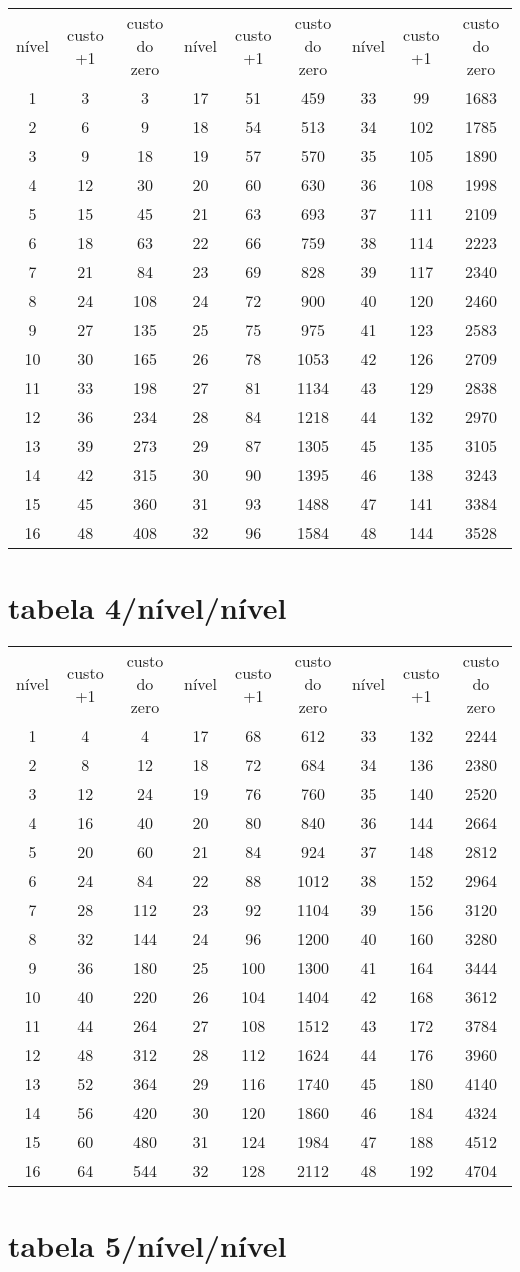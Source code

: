 \begin{longtable}{|c|c|c|c|c|c|c|c|c|}
    nível&custo +1&custo do zero&nível&custo +1&custo do zero&nível&custo +1&custo do zero\tabularnewline 
     1 & 3 & 3 & 17 & 51 & 459 & 33 & 99 & 1683 \tabularnewline 
     2 & 6 & 9 & 18 & 54 & 513 & 34 & 102 & 1785 \tabularnewline 
     3 & 9 & 18 & 19 & 57 & 570 & 35 & 105 & 1890 \tabularnewline 
     4 & 12 & 30 & 20 & 60 & 630 & 36 & 108 & 1998 \tabularnewline 
     5 & 15 & 45 & 21 & 63 & 693 & 37 & 111 & 2109 \tabularnewline 
     6 & 18 & 63 & 22 & 66 & 759 & 38 & 114 & 2223 \tabularnewline 
     7 & 21 & 84 & 23 & 69 & 828 & 39 & 117 & 2340 \tabularnewline 
     8 & 24 & 108 & 24 & 72 & 900 & 40 & 120 & 2460 \tabularnewline 
     9 & 27 & 135 & 25 & 75 & 975 & 41 & 123 & 2583 \tabularnewline 
     10 & 30 & 165 & 26 & 78 & 1053 & 42 & 126 & 2709 \tabularnewline 
     11 & 33 & 198 & 27 & 81 & 1134 & 43 & 129 & 2838 \tabularnewline 
     12 & 36 & 234 & 28 & 84 & 1218 & 44 & 132 & 2970 \tabularnewline 
     13 & 39 & 273 & 29 & 87 & 1305 & 45 & 135 & 3105 \tabularnewline 
     14 & 42 & 315 & 30 & 90 & 1395 & 46 & 138 & 3243 \tabularnewline 
     15 & 45 & 360 & 31 & 93 & 1488 & 47 & 141 & 3384 \tabularnewline 
     16 & 48 & 408 & 32 & 96 & 1584 & 48 & 144 & 3528 \tabularnewline  
\end{longtable} \section{tabela 4/nível/nível} 
\begin{longtable}{|c|c|c|c|c|c|c|c|c|}
    nível&custo +1&custo do zero&nível&custo +1&custo do zero&nível&custo +1&custo do zero\tabularnewline 
     1 & 4 & 4 & 17 & 68 & 612 & 33 & 132 & 2244 \tabularnewline 
     2 & 8 & 12 & 18 & 72 & 684 & 34 & 136 & 2380 \tabularnewline 
     3 & 12 & 24 & 19 & 76 & 760 & 35 & 140 & 2520 \tabularnewline 
     4 & 16 & 40 & 20 & 80 & 840 & 36 & 144 & 2664 \tabularnewline 
     5 & 20 & 60 & 21 & 84 & 924 & 37 & 148 & 2812 \tabularnewline 
     6 & 24 & 84 & 22 & 88 & 1012 & 38 & 152 & 2964 \tabularnewline 
     7 & 28 & 112 & 23 & 92 & 1104 & 39 & 156 & 3120 \tabularnewline 
     8 & 32 & 144 & 24 & 96 & 1200 & 40 & 160 & 3280 \tabularnewline 
     9 & 36 & 180 & 25 & 100 & 1300 & 41 & 164 & 3444 \tabularnewline 
     10 & 40 & 220 & 26 & 104 & 1404 & 42 & 168 & 3612 \tabularnewline 
     11 & 44 & 264 & 27 & 108 & 1512 & 43 & 172 & 3784 \tabularnewline 
     12 & 48 & 312 & 28 & 112 & 1624 & 44 & 176 & 3960 \tabularnewline 
     13 & 52 & 364 & 29 & 116 & 1740 & 45 & 180 & 4140 \tabularnewline 
     14 & 56 & 420 & 30 & 120 & 1860 & 46 & 184 & 4324 \tabularnewline 
     15 & 60 & 480 & 31 & 124 & 1984 & 47 & 188 & 4512 \tabularnewline 
     16 & 64 & 544 & 32 & 128 & 2112 & 48 & 192 & 4704 \tabularnewline  
\end{longtable} \section{tabela 5/nível/nível} 
